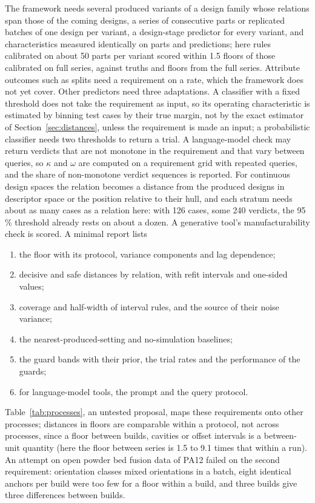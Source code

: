 \documentclass[pdflatex,sn-basic,lineno]{sn-jnl}
\begin{document}
The framework needs several produced variants of a design family whose relations span those of the coming designs, a series of consecutive parts or replicated batches of one design per variant, a design-stage predictor for every variant, and characteristics measured identically on parts and predictions; here rules calibrated on about 50 parts per variant scored within 1.5 floors of those calibrated on full series, against truths and floors from the full series. Attribute outcomes such as splits need a requirement on a rate, which the framework does not yet cover. Other predictors need three adaptations. A classifier with a fixed threshold does not take the requirement as input, so its operating characteristic is estimated by binning test cases by their true margin, not by the exact estimator of Section~\ref{sec:distances}, unless the requirement is made an input; a probabilistic classifier needs two thresholds to return a trial. A language-model check may return verdicts that are not monotone in the requirement and that vary between queries, so $\kappa$ and $\omega$ are computed on a requirement grid with repeated queries, and the share of non-monotone verdict sequences is reported. For continuous design spaces the relation becomes a distance from the produced designs in descriptor space or the position relative to their hull, and each stratum needs about as many cases as a relation here: with 126 cases, some 240 verdicts, the 95\,\% threshold already rests on about a dozen. A generative tool's manufacturability check is scored. A minimal report lists
\begin{enumerate}
\item the floor with its protocol, variance components and lag dependence;
\item decisive and safe distances by relation, with refit intervals and one-sided values;
\item coverage and half-width of interval rules, and the source of their noise variance;
\item the nearest-produced-setting and no-simulation baselines;
\item the guard bands with their prior, the trial rates and the performance of the guards;
\item for language-model tools, the prompt and the query protocol.
\end{enumerate}
Table~\ref{tab:processes}, an untested proposal, maps these requirements onto other processes; distances in floors are comparable within a protocol, not across processes, since a floor between builds, cavities or offset intervals is a between-unit quantity (here the floor between series is 1.5 to 9.1 times that within a run). An attempt on open powder bed fusion data of PA12 \citep{leirmo2021data} failed on the second requirement: orientation classes mixed orientations in a batch, eight identical anchors per build were too few for a floor within a build, and three builds give three differences between builds.
\end{document}
